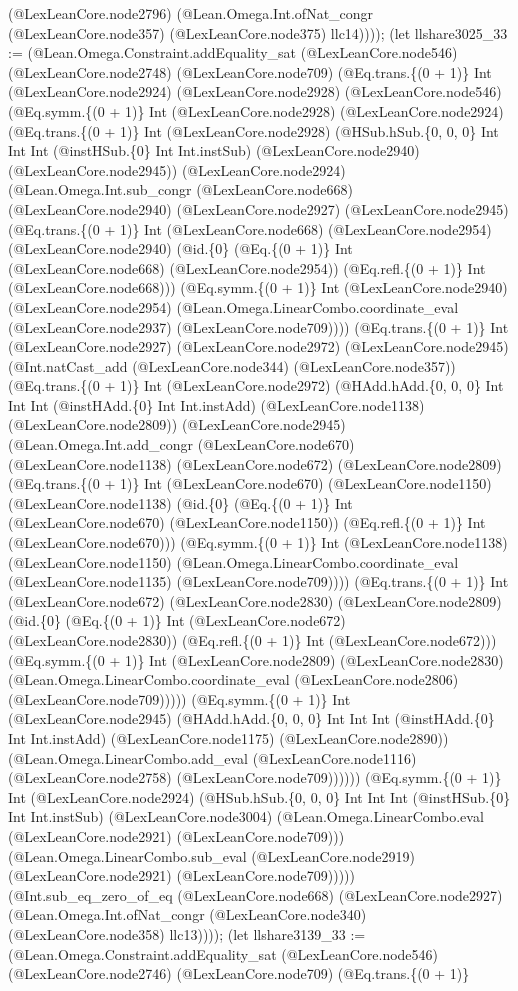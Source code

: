 \documentclass[11pt]{article}
\begin{document}
(@LexLeanCore.node2796) (@Lean.Omega.Int.ofNat\_congr (@LexLeanCore.node357) (@LexLeanCore.node375) llc14)))); (let llshare3025\_33 := (@Lean.Omega.Constraint.addEquality\_sat (@LexLeanCore.node546) (@LexLeanCore.node2748) (@LexLeanCore.node709) (@Eq.trans.\{(0 + 1)\} Int (@LexLeanCore.node2924) (@LexLeanCore.node2928) (@LexLeanCore.node546) (@Eq.symm.\{(0 + 1)\} Int (@LexLeanCore.node2928) (@LexLeanCore.node2924) (@Eq.trans.\{(0 + 1)\} Int (@LexLeanCore.node2928) (@HSub.hSub.\{0, 0, 0\} Int Int Int (@instHSub.\{0\} Int Int.instSub) (@LexLeanCore.node2940) (@LexLeanCore.node2945)) (@LexLeanCore.node2924) (@Lean.Omega.Int.sub\_congr (@LexLeanCore.node668) (@LexLeanCore.node2940) (@LexLeanCore.node2927) (@LexLeanCore.node2945) (@Eq.trans.\{(0 + 1)\} Int (@LexLeanCore.node668) (@LexLeanCore.node2954) (@LexLeanCore.node2940) (@id.\{0\} (@Eq.\{(0 + 1)\} Int (@LexLeanCore.node668) (@LexLeanCore.node2954)) (@Eq.refl.\{(0 + 1)\} Int (@LexLeanCore.node668))) (@Eq.symm.\{(0 + 1)\} Int (@LexLeanCore.node2940) (@LexLeanCore.node2954) (@Lean.Omega.LinearCombo.coordinate\_eval (@LexLeanCore.node2937) (@LexLeanCore.node709)))) (@Eq.trans.\{(0 + 1)\} Int (@LexLeanCore.node2927) (@LexLeanCore.node2972) (@LexLeanCore.node2945) (@Int.natCast\_add (@LexLeanCore.node344) (@LexLeanCore.node357)) (@Eq.trans.\{(0 + 1)\} Int (@LexLeanCore.node2972) (@HAdd.hAdd.\{0, 0, 0\} Int Int Int (@instHAdd.\{0\} Int Int.instAdd) (@LexLeanCore.node1138) (@LexLeanCore.node2809)) (@LexLeanCore.node2945) (@Lean.Omega.Int.add\_congr (@LexLeanCore.node670) (@LexLeanCore.node1138) (@LexLeanCore.node672) (@LexLeanCore.node2809) (@Eq.trans.\{(0 + 1)\} Int (@LexLeanCore.node670) (@LexLeanCore.node1150) (@LexLeanCore.node1138) (@id.\{0\} (@Eq.\{(0 + 1)\} Int (@LexLeanCore.node670) (@LexLeanCore.node1150)) (@Eq.refl.\{(0 + 1)\} Int (@LexLeanCore.node670))) (@Eq.symm.\{(0 + 1)\} Int (@LexLeanCore.node1138) (@LexLeanCore.node1150) (@Lean.Omega.LinearCombo.coordinate\_eval (@LexLeanCore.node1135) (@LexLeanCore.node709)))) (@Eq.trans.\{(0 + 1)\} Int (@LexLeanCore.node672) (@LexLeanCore.node2830) (@LexLeanCore.node2809) (@id.\{0\} (@Eq.\{(0 + 1)\} Int (@LexLeanCore.node672) (@LexLeanCore.node2830)) (@Eq.refl.\{(0 + 1)\} Int (@LexLeanCore.node672))) (@Eq.symm.\{(0 + 1)\} Int (@LexLeanCore.node2809) (@LexLeanCore.node2830) (@Lean.Omega.LinearCombo.coordinate\_eval (@LexLeanCore.node2806) (@LexLeanCore.node709))))) (@Eq.symm.\{(0 + 1)\} Int (@LexLeanCore.node2945) (@HAdd.hAdd.\{0, 0, 0\} Int Int Int (@instHAdd.\{0\} Int Int.instAdd) (@LexLeanCore.node1175) (@LexLeanCore.node2890)) (@Lean.Omega.LinearCombo.add\_eval (@LexLeanCore.node1116) (@LexLeanCore.node2758) (@LexLeanCore.node709)))))) (@Eq.symm.\{(0 + 1)\} Int (@LexLeanCore.node2924) (@HSub.hSub.\{0, 0, 0\} Int Int Int (@instHSub.\{0\} Int Int.instSub) (@LexLeanCore.node3004) (@Lean.Omega.LinearCombo.eval (@LexLeanCore.node2921) (@LexLeanCore.node709))) (@Lean.Omega.LinearCombo.sub\_eval (@LexLeanCore.node2919) (@LexLeanCore.node2921) (@LexLeanCore.node709))))) (@Int.sub\_eq\_zero\_of\_eq (@LexLeanCore.node668) (@LexLeanCore.node2927) (@Lean.Omega.Int.ofNat\_congr (@LexLeanCore.node340) (@LexLeanCore.node358) llc13)))); (let llshare3139\_33 := (@Lean.Omega.Constraint.addEquality\_sat (@LexLeanCore.node546) (@LexLeanCore.node2746) (@LexLeanCore.node709) (@Eq.trans.\{(0 + 1)\} 
\end{document}
